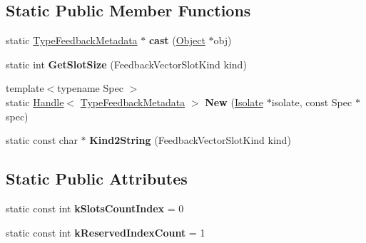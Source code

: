 \subsection*{Static Public Member Functions}
\begin{DoxyCompactItemize}
\item 
static \hyperlink{classv8_1_1internal_1_1_type_feedback_metadata}{Type\+Feedback\+Metadata} $\ast$ {\bfseries cast} (\hyperlink{classv8_1_1internal_1_1_object}{Object} $\ast$obj)\hypertarget{classv8_1_1internal_1_1_type_feedback_metadata_a9c8fee792d0fa498fb683a6fecdc2848}{}\label{classv8_1_1internal_1_1_type_feedback_metadata_a9c8fee792d0fa498fb683a6fecdc2848}

\item 
static int {\bfseries Get\+Slot\+Size} (Feedback\+Vector\+Slot\+Kind kind)\hypertarget{classv8_1_1internal_1_1_type_feedback_metadata_a058c2567caba5b1e74d0a2cff5782826}{}\label{classv8_1_1internal_1_1_type_feedback_metadata_a058c2567caba5b1e74d0a2cff5782826}

\item 
{\footnotesize template$<$typename Spec $>$ }\\static \hyperlink{classv8_1_1internal_1_1_handle}{Handle}$<$ \hyperlink{classv8_1_1internal_1_1_type_feedback_metadata}{Type\+Feedback\+Metadata} $>$ {\bfseries New} (\hyperlink{classv8_1_1internal_1_1_isolate}{Isolate} $\ast$isolate, const Spec $\ast$spec)\hypertarget{classv8_1_1internal_1_1_type_feedback_metadata_aa67312896e194beb6e321ef02b275089}{}\label{classv8_1_1internal_1_1_type_feedback_metadata_aa67312896e194beb6e321ef02b275089}

\item 
static const char $\ast$ {\bfseries Kind2\+String} (Feedback\+Vector\+Slot\+Kind kind)\hypertarget{classv8_1_1internal_1_1_type_feedback_metadata_aa258dcf14293c07c34c828779ea64ea9}{}\label{classv8_1_1internal_1_1_type_feedback_metadata_aa258dcf14293c07c34c828779ea64ea9}

\end{DoxyCompactItemize}
\subsection*{Static Public Attributes}
\begin{DoxyCompactItemize}
\item 
static const int {\bfseries k\+Slots\+Count\+Index} = 0\hypertarget{classv8_1_1internal_1_1_type_feedback_metadata_a8f130c4581a1c51eff5b57043701997e}{}\label{classv8_1_1internal_1_1_type_feedback_metadata_a8f130c4581a1c51eff5b57043701997e}

\item 
static const int {\bfseries k\+Reserved\+Index\+Count} = 1\hypertarget{classv8_1_1internal_1_1_type_feedback_metadata_a4bf10c653118cb0f05ebd6948ee682b1}{}\label{classv8_1_1internal_1_1_type_feedback_metadata_a4bf10c653118cb0f05ebd6948ee682b1}

\end{DoxyCompactItemize}
